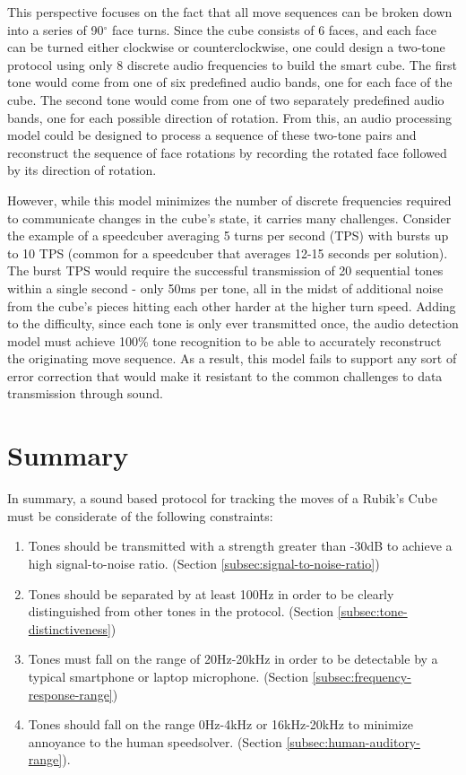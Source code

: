 This perspective focuses on the fact that all move sequences can be broken down into a series of 90$^\circ$ face turns.
Since the cube consists of 6 faces, and each face can be turned either clockwise or counterclockwise, one could design a two-tone protocol using only 8 discrete audio frequencies to build the smart cube.
The first tone would come from one of six predefined audio bands, one for each face of the cube. 
The second tone would come from one of two separately predefined audio bands, one for each possible direction of rotation.
From this, an audio processing model could be designed to process a sequence of these two-tone pairs and reconstruct the sequence of face rotations by recording the rotated face followed by its direction of rotation.

However, while this model minimizes the number of discrete frequencies required to communicate changes in the cube's state, it carries many challenges.
Consider the example of a speedcuber averaging 5 turns per second (TPS) with bursts up to 10 TPS (common for a speedcuber that averages 12-15 seconds per solution).
The burst TPS would require the successful transmission of 20 sequential tones within a single second - only 50ms per tone, all in the midst of additional noise from the cube's pieces hitting each other harder at the higher turn speed.
Adding to the difficulty, since each tone is only ever transmitted once, the audio detection model must achieve 100\% tone recognition to be able to accurately reconstruct the originating move sequence.
As a result, this model fails to support any sort of error correction that would make it resistant to the common challenges to data transmission through sound.

\newpage
\section{Summary}
\label{sec:protocol-summary}
In summary, a sound based protocol for tracking the moves of a Rubik's Cube must be considerate of the following constraints:

\begin{enumerate}
    \item Tones should be transmitted with a strength greater than -30dB to achieve a high signal-to-noise ratio. (Section \ref{subsec:signal-to-noise-ratio})
    \item Tones should be separated by at least 100Hz in order to be clearly distinguished from other tones in the protocol. (Section \ref{subsec:tone-distinctiveness})
    \item Tones must fall on the range of 20Hz-20kHz in order to be detectable by a typical smartphone or laptop microphone. (Section \ref{subsec:frequency-response-range})
    \item Tones should fall on the range 0Hz-4kHz or 16kHz-20kHz to minimize annoyance to the human speedsolver. (Section \ref{subsec:human-auditory-range}).
\end{enumerate}

